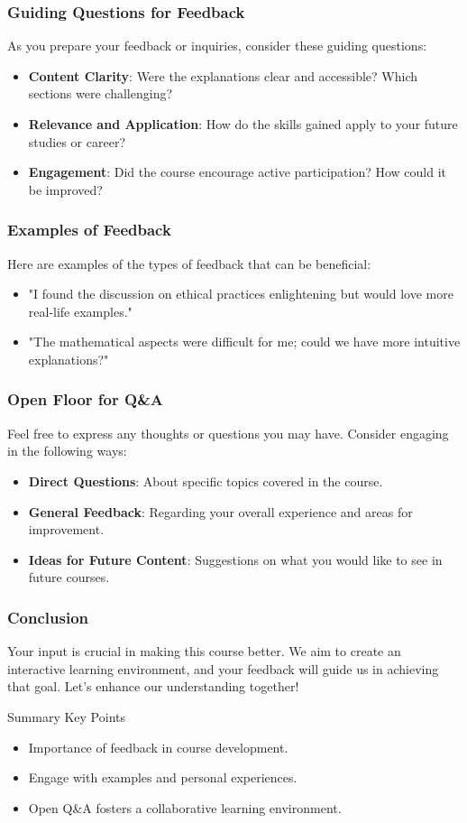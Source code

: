 \documentclass[aspectratio=169]{beamer}
\begin{document}
\begin{frame}[fragile]
    \frametitle{Guiding Questions for Feedback}
    As you prepare your feedback or inquiries, consider these guiding questions:
    \begin{itemize}
        \item \textbf{Content Clarity}: Were the explanations clear and accessible? Which sections were challenging?
        \item \textbf{Relevance and Application}: How do the skills gained apply to your future studies or career?
        \item \textbf{Engagement}: Did the course encourage active participation? How could it be improved?
    \end{itemize}
\end{frame}

\begin{frame}[fragile]
    \frametitle{Examples of Feedback}
    Here are examples of the types of feedback that can be beneficial:
    \begin{itemize}
        \item "I found the discussion on ethical practices enlightening but would love more real-life examples."
        \item "The mathematical aspects were difficult for me; could we have more intuitive explanations?"
    \end{itemize}
\end{frame}

\begin{frame}[fragile]
    \frametitle{Open Floor for Q\&A}
    Feel free to express any thoughts or questions you may have. Consider engaging in the following ways:
    \begin{itemize}
        \item \textbf{Direct Questions}: About specific topics covered in the course.
        \item \textbf{General Feedback}: Regarding your overall experience and areas for improvement.
        \item \textbf{Ideas for Future Content}: Suggestions on what you would like to see in future courses.
    \end{itemize}
\end{frame}

\begin{frame}[fragile]
    \frametitle{Conclusion}
    Your input is crucial in making this course better. We aim to create an interactive learning environment, and your feedback will guide us in achieving that goal. Let’s enhance our understanding together! 
    \begin{block}{Summary Key Points}
        \begin{itemize}
            \item Importance of feedback in course development.
            \item Engage with examples and personal experiences.
            \item Open Q\&A fosters a collaborative learning environment.
        \end{itemize}
    \end{block}
\end{frame}
\end{document}
